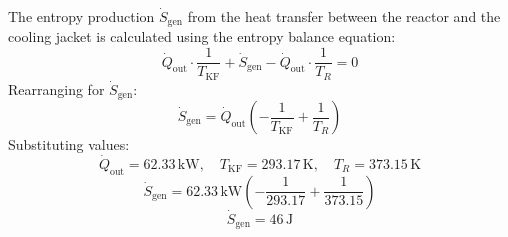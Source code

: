The entropy production \( \dot{S}_{\text{gen}} \) from the heat transfer between the reactor and the cooling jacket is calculated using the entropy balance equation:  
\[
\dot{Q}_{\text{out}} \cdot \frac{1}{T_{\text{KF}}} + \dot{S}_{\text{gen}} - \dot{Q}_{\text{out}} \cdot \frac{1}{T_R} = 0
\]  
Rearranging for \( \dot{S}_{\text{gen}} \):  
\[
\dot{S}_{\text{gen}} = \dot{Q}_{\text{out}} \left(-\frac{1}{T_{\text{KF}}} + \frac{1}{T_R}\right)
\]  
Substituting values:  
\[
\dot{Q}_{\text{out}} = 62.33 \, \text{kW}, \quad T_{\text{KF}} = 293.17 \, \text{K}, \quad T_R = 373.15 \, \text{K}
\]  
\[
\dot{S}_{\text{gen}} = 62.33 \, \text{kW} \left(-\frac{1}{293.17} + \frac{1}{373.15}\right)
\]  
\[
\dot{S}_{\text{gen}} = 46 \, \text{J}
\]